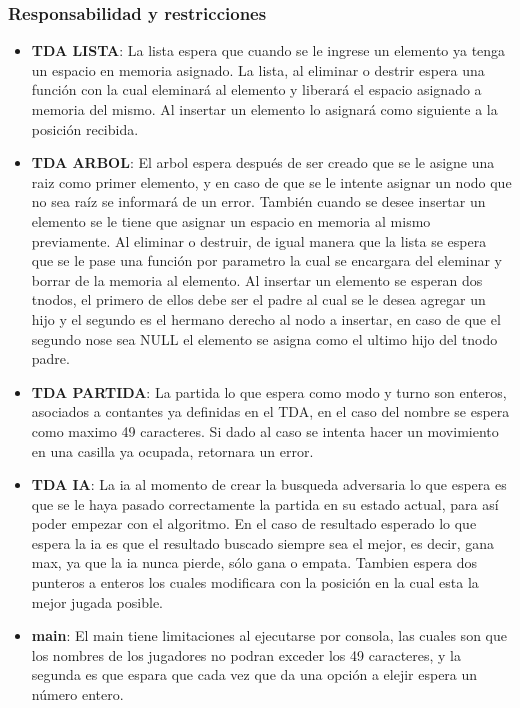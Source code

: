 \documentclass[12pt,a4paper]{article}
\begin{document}
\subsubsection{Responsabilidad y restricciones}
\begin{itemize}
    \item {\bf TDA LISTA}: La lista espera que cuando se le ingrese un elemento ya tenga un espacio en memoria asignado. La lista, al eliminar o destrir espera una funci\'on con la cual eleminar\'a al elemento y liberar\'a el espacio asignado a memoria del mismo. Al insertar un elemento lo asignar\'a como siguiente a la posici\'on recibida.
    \item {\bf TDA ARBOL}: El arbol espera despu\'es de ser creado que se le asigne una raiz como primer elemento, y en caso de que se le intente asignar un nodo que no sea ra\'iz se informar\'a de un error. Tambi\'en cuando se desee insertar un elemento se le tiene que asignar un espacio en memoria al mismo previamente. Al eliminar o destruir, de igual manera que la lista se espera que se le pase una funci\'on por parametro la cual se encargara del eleminar y borrar de la memoria al elemento. Al insertar un elemento se esperan dos tnodos, el primero de ellos debe ser el padre al cual se le desea agregar un hijo y el segundo es el hermano derecho al nodo a insertar, en caso de que el segundo nose sea NULL el elemento se asigna como el ultimo hijo del tnodo padre.
    \item {\bf TDA PARTIDA}: La partida lo que espera como modo y turno son enteros, asociados a contantes ya definidas en el TDA, en el caso del nombre se espera como maximo 49 caracteres. Si dado al caso se intenta hacer un movimiento en una casilla ya ocupada, retornara un error.
    \item {\bf TDA IA}: La ia al momento de crear la busqueda adversaria lo que espera es que se le haya pasado correctamente la partida en su estado actual, para as\'i poder empezar con el algoritmo. En el caso de resultado esperado lo que espera la ia es que el resultado buscado siempre sea el mejor, es decir, gana max, ya que la ia nunca pierde, s\'olo gana o empata. Tambien espera dos punteros a enteros los cuales modificara con la posici\'on en la cual esta la mejor jugada posible.
    \item {\bf main}: El main tiene limitaciones al ejecutarse por consola, las cuales son que los nombres de los jugadores no podran exceder los 49 caracteres, y la segunda es que espara que cada vez que da una opci\'on a elejir espera un n\'umero entero.
\end{itemize}
\end{document}
